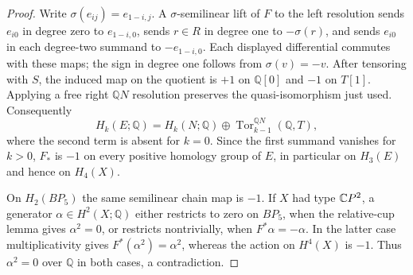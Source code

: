 \begin{proof}
Write $\sigma(e_{ij})=e_{1-i,j}$. A $\sigma$-semilinear lift
of $F$ to the left resolution sends $e_{i0}$ in degree zero
to $e_{1-i,0}$, sends $r\in R$ in degree one to $-\sigma(r)$,
and sends $e_{i0}$ in each degree-two summand to
$-e_{1-i,0}$. Each displayed differential commutes with these
maps; the sign in degree one follows from $\sigma(v)=-v$.
After tensoring with $S$, the induced map on the quotient is
$+1$ on $\mathbb Q[0]$ and $-1$ on $T[1]$.
Applying a free right $\mathbb QN$ resolution preserves the
quasi-isomorphism just used. Consequently
\[
H_k(E;\mathbb Q)=H_k(N;\mathbb Q)\oplus
\operatorname{Tor}^{\mathbb QN}_{k-1}(\mathbb Q,T),
\]
where the second term is absent for $k=0$. Since the first
summand vanishes for $k>0$, $F_*$ is $-1$ on every positive
homology group of $E$, in particular on $H_3(E)$ and hence
on $H_4(X)$.

On $H_2(BP_5)$ the same semilinear chain map is $-1$.
If $X$ had type $\mathbb{C}P^2$, a generator
$\alpha\in H^2(X;\mathbb Q)$ either restricts to zero on
$BP_5$, when the relative-cup lemma gives $\alpha^2=0$, or
restricts nontrivially, when $F^*\alpha=-\alpha$.
In the latter case multiplicativity gives
$F^*(\alpha^2)=\alpha^2$, whereas the action on $H^4(X)$
is $-1$. Thus $\alpha^2=0$ over $\mathbb Q$ in both cases,
a contradiction.
\end{proof}

